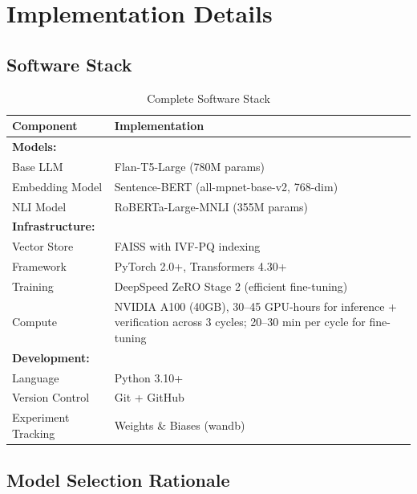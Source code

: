 \documentclass[12pt,a4paper]{article}
\theoremstyle{definition}
\begin{document}
\section{Implementation Details}

\subsection{Software Stack}

\begin{table}[htbp]
\centering
\caption{Complete Software Stack}
\begin{tabular}{ll}
\toprule
\textbf{Component} & \textbf{Implementation} \\
\midrule
\textbf{Models:} & \\
Base LLM & Flan-T5-Large (780M params) \\
Embedding Model & Sentence-BERT (all-mpnet-base-v2, 768-dim) \\
NLI Model & RoBERTa-Large-MNLI (355M params) \\
\midrule
\textbf{Infrastructure:} & \\
Vector Store & FAISS with IVF-PQ indexing \\
Framework & PyTorch 2.0+, Transformers 4.30+ \\
Training & DeepSpeed ZeRO Stage 2 (efficient fine-tuning) \\
Compute & NVIDIA A100 (40GB), 30--45 GPU-hours for inference + verification across 3 cycles; 20--30 min per cycle for fine-tuning \\
\midrule
\textbf{Development:} & \\
Language & Python 3.10+ \\
Version Control & Git + GitHub \\
Experiment Tracking & Weights \& Biases (wandb) \\
\bottomrule
\end{tabular}
\end{table}

\subsection{Model Selection Rationale}
\end{document}
